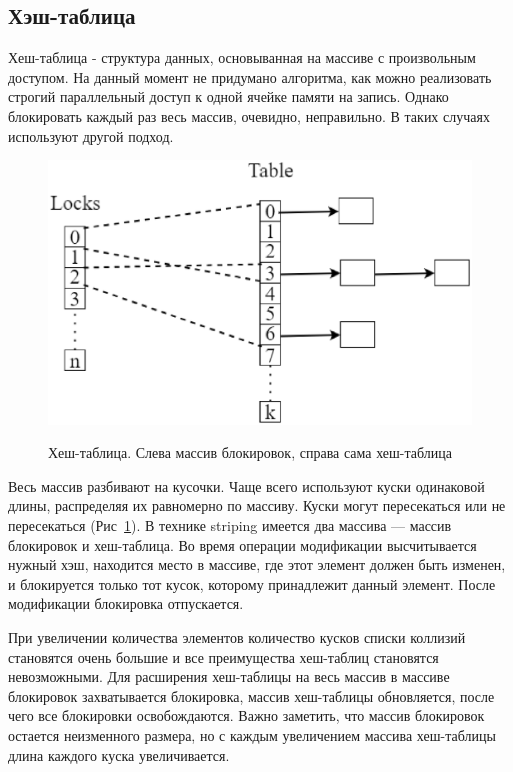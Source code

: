 \documentclass[12pt]{article}
\begin{document}
{			\subsection{Хэш-таблица}
				\par Хеш-таблица - структура данных, основыванная на массиве с произвольным доступом. На данный момент не придумано алгоритма, как можно реализовать строгий параллельный доступ к одной ячейке памяти на запись. Однако блокировать каждый раз весь массив, очевидно, неправильно. В таких случаях используют другой подход.
				\begin{figure}[h]
					\begin{minipage}[h]{1\linewidth}
						\center \includegraphics[width=1\linewidth]{19} \\
					\end{minipage}
					\caption{Хеш-таблица. Слева массив блокировок, справа сама хеш-таблица}
					\label{pic:hashTable}
				\end{figure}
				\par Весь массив разбивают на кусочки. Чаще всего используют куски одинаковой длины, распределяя их равномерно по массиву. Куски могут пересекаться или не пересекаться (Рис~\ref{pic:hashTable}). В технике striping имеется два массива — массив блокировок и хеш-таблица. Во время операции модификации высчитывается нужный хэш, находится место в массиве, где этот элемент должен быть изменен, и блокируется только тот кусок, которому принадлежит данный элемент. После модификации блокировка отпускается.
				\par При увеличении количества элементов количество кусков списки коллизий становятся очень большие и все преимущества хеш-таблиц становятся невозможными. Для расширения хеш-таблицы на весь массив в массиве блокировок захватывается блокировка, массив хеш-таблицы обновляется, после чего все блокировки освобождаются. Важно заметить, что массив блокировок остается неизменного размера, но с каждым увеличением массива хеш-таблицы длина каждого куска увеличивается.
}
\end{document}
